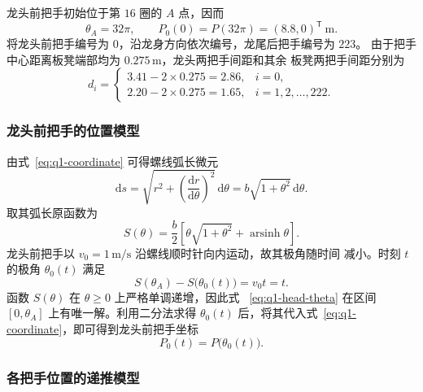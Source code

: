 \documentclass[UTF8,fontset=windows,a4paper,12pt]{ctexart}
\begin{document}
龙头前把手初始位于第 $16$ 圈的 $A$ 点，因而
\begin{equation}
  \theta_A=32\pi,\qquad
  P_0(0)=P(32\pi)=(8.8,0)^\mathsf{T}\ \mathrm{m}.
  \label{eq:q1-initial}
\end{equation}
将龙头前把手编号为 $0$，沿龙身方向依次编号，龙尾后把手编号为 $223$。
由于把手中心距离板凳端部均为 $0.275\,\mathrm{m}$，龙头两把手间距和其余
板凳两把手间距分别为
\begin{equation}
  d_i=
  \begin{cases}
    3.41-2\times0.275=2.86, & i=0,\\
    2.20-2\times0.275=1.65, & i=1,2,\ldots,222.
  \end{cases}
  \label{eq:q1-segment-length}
\end{equation}

\subsubsection{龙头前把手的位置模型}

由式~\eqref{eq:q1-coordinate} 可得螺线弧长微元
\begin{equation}
  \mathrm{d}s
  =\sqrt{r^2+\left(\frac{\mathrm{d}r}{\mathrm{d}\theta}\right)^2}
   \,\mathrm{d}\theta
  =b\sqrt{1+\theta^2}\,\mathrm{d}\theta.
  \label{eq:q1-arc-element}
\end{equation}
取其弧长原函数为
\begin{equation}
  S(\theta)
  =\frac{b}{2}
  \left[
    \theta\sqrt{1+\theta^2}
    +\operatorname{arsinh}\theta
  \right].
  \label{eq:q1-arc-length}
\end{equation}
龙头前把手以 $v_0=1\,\mathrm{m/s}$ 沿螺线顺时针向内运动，故其极角随时间
减小。时刻 $t$ 的极角 $\theta_0(t)$ 满足
\begin{equation}
  S(\theta_A)-S\bigl(\theta_0(t)\bigr)=v_0t=t.
  \label{eq:q1-head-theta}
\end{equation}
函数 $S(\theta)$ 在 $\theta\geq 0$ 上严格单调递增，因此式
~\eqref{eq:q1-head-theta} 在区间 $[0,\theta_A]$ 上有唯一解。利用二分法求得
$\theta_0(t)$ 后，将其代入式~\eqref{eq:q1-coordinate}，即可得到龙头前把手坐标
\begin{equation}
  P_0(t)=P\bigl(\theta_0(t)\bigr).
  \label{eq:q1-head-position}
\end{equation}

\subsubsection{各把手位置的递推模型}
\end{document}
